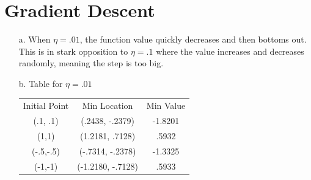 \documentclass{homework}
\begin{document}
\section{Gradient Descent}
\begin{itemize}
    \item[a. ] When \(\eta =.01\), the function value quickly decreases and then bottoms out. This is in stark opposition to \(\eta = .1\) where the value increases and decreases randomly, meaning the step is too big. 

    \begin{figure}[H]
            \centering
            \qquad
        \end{figure}
        
    \item[b. ] Table for \(\eta = .01\)
    \begin{table}[H]
        \centering
        \begin{tabular}{c|c|c}
        Initial Point & Min Location      & Min Value \\
        (.1, .1)      & (.2438, -.2379)   & -1.8201   \\
        (1,1)         & (1.2181, .7128)   & .5932     \\
        (-.5,-.5)     & (-.7314, -.2378)  & -1.3325   \\
        (-1,-1)       & (-1.2180, -.7128) & .5933    
        \end{tabular}
    \end{table}
    

\end{itemize}
\end{document}
